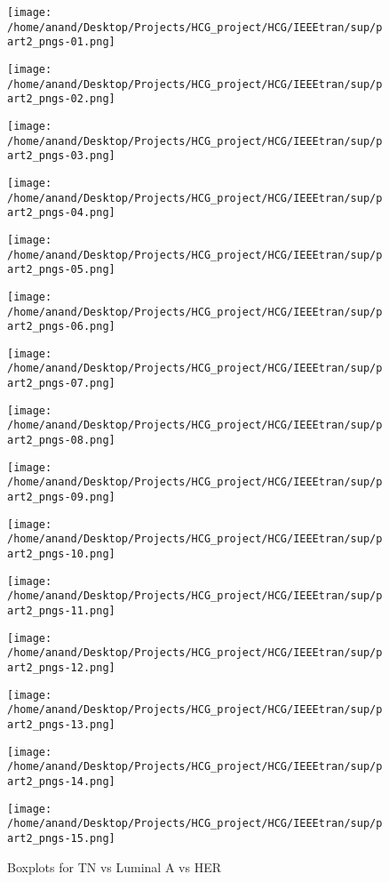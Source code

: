 \documentclass[10pt,final,1p,times,twocolumn]{elsarticle}
\begin{document}
\begin{figure*}
\begin{multicols}{2}
    \texttt{[image: /home/anand/Desktop/Projects/HCG\_project/HCG/IEEEtran/sup/part2\_pngs-01.png]}\par 
    \texttt{[image: /home/anand/Desktop/Projects/HCG\_project/HCG/IEEEtran/sup/part2\_pngs-02.png]}\par 
    \texttt{[image: /home/anand/Desktop/Projects/HCG\_project/HCG/IEEEtran/sup/part2\_pngs-03.png]}\par 
    \texttt{[image: /home/anand/Desktop/Projects/HCG\_project/HCG/IEEEtran/sup/part2\_pngs-04.png]}\par 
    \end{multicols}
\begin{multicols}{2}
    \texttt{[image: /home/anand/Desktop/Projects/HCG\_project/HCG/IEEEtran/sup/part2\_pngs-05.png]}\par 
    \texttt{[image: /home/anand/Desktop/Projects/HCG\_project/HCG/IEEEtran/sup/part2\_pngs-06.png]}\par 
    \texttt{[image: /home/anand/Desktop/Projects/HCG\_project/HCG/IEEEtran/sup/part2\_pngs-07.png]}\par 
    \texttt{[image: /home/anand/Desktop/Projects/HCG\_project/HCG/IEEEtran/sup/part2\_pngs-08.png]}\par 
\end{multicols}
\end{figure*}

\begin{figure*}
\begin{multicols}{2}
    \texttt{[image: /home/anand/Desktop/Projects/HCG\_project/HCG/IEEEtran/sup/part2\_pngs-09.png]}\par 
    \texttt{[image: /home/anand/Desktop/Projects/HCG\_project/HCG/IEEEtran/sup/part2\_pngs-10.png]}\par 
    \texttt{[image: /home/anand/Desktop/Projects/HCG\_project/HCG/IEEEtran/sup/part2\_pngs-11.png]}\par 
    \texttt{[image: /home/anand/Desktop/Projects/HCG\_project/HCG/IEEEtran/sup/part2\_pngs-12.png]}\par 
    \end{multicols}
\begin{multicols}{2}
    \texttt{[image: /home/anand/Desktop/Projects/HCG\_project/HCG/IEEEtran/sup/part2\_pngs-13.png]}\par 
    \texttt{[image: /home/anand/Desktop/Projects/HCG\_project/HCG/IEEEtran/sup/part2\_pngs-14.png]}\par 
    \texttt{[image: /home/anand/Desktop/Projects/HCG\_project/HCG/IEEEtran/sup/part2\_pngs-15.png]}\par 
\end{multicols}
\caption{Boxplots for TN vs Luminal A vs HER}
\label{f2}
\end{figure*}
\end{document}
